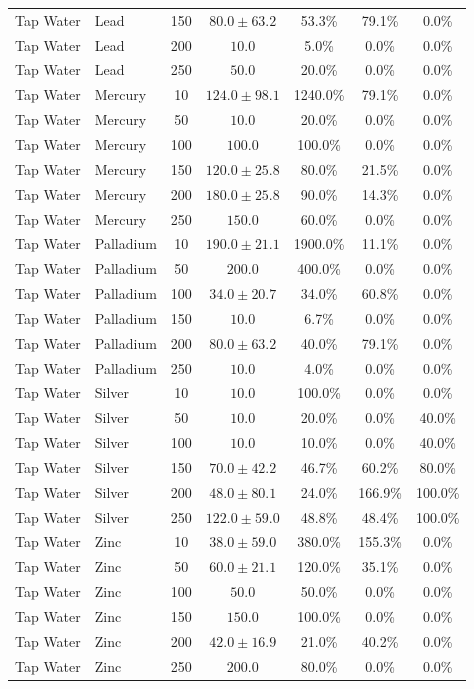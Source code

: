 \begin{table}[!t]
\begin{tabular}{llccccc}
Tap Water & Lead & 150 & $80.0 \pm 63.2$ & 53.3\% & 79.1\% & 0.0\% \\
Tap Water & Lead & 200 & $10.0$ & 5.0\% & 0.0\% & 0.0\% \\
Tap Water & Lead & 250 & $50.0$ & 20.0\% & 0.0\% & 0.0\% \\
Tap Water & Mercury & 10 & $124.0 \pm 98.1$ & 1240.0\% & 79.1\% & 0.0\% \\
Tap Water & Mercury & 50 & $10.0$ & 20.0\% & 0.0\% & 0.0\% \\
Tap Water & Mercury & 100 & $100.0$ & 100.0\% & 0.0\% & 0.0\% \\
Tap Water & Mercury & 150 & $120.0 \pm 25.8$ & 80.0\% & 21.5\% & 0.0\% \\
Tap Water & Mercury & 200 & $180.0 \pm 25.8$ & 90.0\% & 14.3\% & 0.0\% \\
Tap Water & Mercury & 250 & $150.0$ & 60.0\% & 0.0\% & 0.0\% \\
Tap Water & Palladium & 10 & $190.0 \pm 21.1$ & 1900.0\% & 11.1\% & 0.0\% \\
Tap Water & Palladium & 50 & $200.0$ & 400.0\% & 0.0\% & 0.0\% \\
Tap Water & Palladium & 100 & $34.0 \pm 20.7$ & 34.0\% & 60.8\% & 0.0\% \\
Tap Water & Palladium & 150 & $10.0$ & 6.7\% & 0.0\% & 0.0\% \\
Tap Water & Palladium & 200 & $80.0 \pm 63.2$ & 40.0\% & 79.1\% & 0.0\% \\
Tap Water & Palladium & 250 & $10.0$ & 4.0\% & 0.0\% & 0.0\% \\
Tap Water & Silver & 10 & $10.0$ & 100.0\% & 0.0\% & 0.0\% \\
Tap Water & Silver & 50 & $10.0$ & 20.0\% & 0.0\% & 40.0\% \\
Tap Water & Silver & 100 & $10.0$ & 10.0\% & 0.0\% & 40.0\% \\
Tap Water & Silver & 150 & $70.0 \pm 42.2$ & 46.7\% & 60.2\% & 80.0\% \\
Tap Water & Silver & 200 & $48.0 \pm 80.1$ & 24.0\% & 166.9\% & 100.0\% \\
Tap Water & Silver & 250 & $122.0 \pm 59.0$ & 48.8\% & 48.4\% & 100.0\% \\
Tap Water & Zinc & 10 & $38.0 \pm 59.0$ & 380.0\% & 155.3\% & 0.0\% \\
Tap Water & Zinc & 50 & $60.0 \pm 21.1$ & 120.0\% & 35.1\% & 0.0\% \\
Tap Water & Zinc & 100 & $50.0$ & 50.0\% & 0.0\% & 0.0\% \\
Tap Water & Zinc & 150 & $150.0$ & 100.0\% & 0.0\% & 0.0\% \\
Tap Water & Zinc & 200 & $42.0 \pm 16.9$ & 21.0\% & 40.2\% & 0.0\% \\
Tap Water & Zinc & 250 & $200.0$ & 80.0\% & 0.0\% & 0.0\% \\
\bottomrule
\end{tabular}
\end{table}